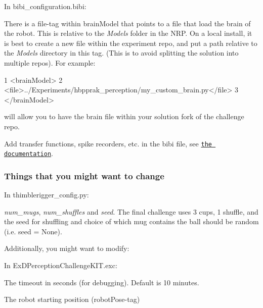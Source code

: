 In {\ttfamily bibi\+\_\+configuration.\+bibi}\+:


\begin{DoxyItemize}
\item There is a {\ttfamily file}-\/tag within {\ttfamily brain\+Model} that points to a file that load the brain of the robot. This is relative to the {\itshape Models} folder in the N\+RP. On a local install, it is best to create a new file within the experiment repo, and put a path relative to the {\itshape Models} directory in this tag. (This is to avoid splitting the solution into multiple repos). For example\+: 
\begin{DoxyCode}
1 <\textcolor{keywordtype}{brainModel}>
2     <\textcolor{keywordtype}{file}>../\textcolor{keyword}{Experiments}/\textcolor{keyword}{hbpprak\_perception}/\textcolor{keyword}{my\_custom\_brain.py}</\textcolor{keywordtype}{file}>
3 </\textcolor{keywordtype}{brainModel}>
\end{DoxyCode}
 will allow you to have the brain file within your solution fork of the challenge repo.
\item Add transfer functions, spike recorders, etc. in the bibi file, see \href{https://developer.humanbrainproject.eu/docs/projects/HBP%20Neurorobotics%20Platform/1.2/nrp/tutorials/transfer_function/bibi_config.html}{\tt the documentation}.
\end{DoxyItemize}

\subsubsection*{Things that you might want to change}

In {\ttfamily thimblerigger\+\_\+config.\+py}\+:
\begin{DoxyItemize}
\item {\itshape num\+\_\+mugs}, {\itshape num\+\_\+shuffles} and {\itshape seed}. The final challenge uses 3 cups, 1 shuffle, and the seed for shuffling and choice of which mug contains the ball should be random (i.\+e. {\ttfamily seed = None}).
\end{DoxyItemize}

Additionally, you might want to modify\+:

In {\ttfamily Ex\+D\+Perception\+Challenge\+K\+I\+T.\+exc}\+:


\begin{DoxyItemize}
\item The timeout in seconds (for debugging). Default is 10 minutes.
\item The robot starting position ({\ttfamily robot\+Pose}-\/tag)
\end{DoxyItemize}


